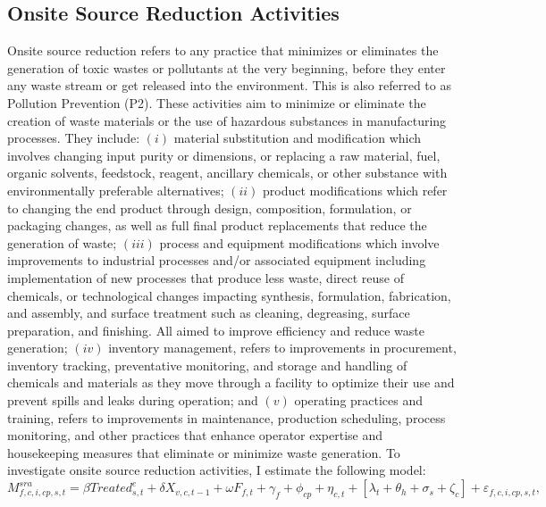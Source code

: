 \documentclass[12pt, english]{article}
\begin{document}
    \subsection{Onsite Source Reduction Activities}\label{subsec:onsite-source-reduction-activities}
    Onsite source reduction refers to any practice that minimizes or eliminates the generation of toxic wastes or pollutants at the very beginning, before they enter any waste stream or get released into the environment. This is also referred to as Pollution Prevention (P2). These activities aim to minimize or eliminate the creation of waste materials or the use of hazardous substances in manufacturing processes. They include: $(i)$ material substitution and modification which involves changing input purity or dimensions, or replacing a raw material, fuel, organic solvents, feedstock, reagent, ancillary chemicals, or other substance with environmentally preferable alternatives; $(ii)$ product modifications which refer to changing the end product through design, composition, formulation, or packaging changes, as well as full final product replacements that reduce the generation of waste; $(iii)$ process and equipment modifications which involve improvements to industrial processes and/or associated equipment including implementation of new processes that produce less waste, direct reuse of chemicals, or technological changes impacting synthesis, formulation, fabrication, and assembly, and surface treatment such as cleaning, degreasing, surface preparation, and finishing. All aimed to improve efficiency and reduce waste generation; $(iv)$ inventory management, refers to improvements in procurement, inventory tracking, preventative monitoring, and storage and handling of chemicals and materials as they move through a facility to optimize their use and prevent spills and leaks during operation; and $(v)$ operating practices and training, refers to improvements in maintenance, production scheduling, process monitoring, and other practices that enhance operator expertise and housekeeping measures that eliminate or minimize waste generation. To investigate onsite source reduction activities, I estimate the following model:
    \begin{equation}
        M_{f,c,i,cp,s,t}^{sra} = \beta Treated_{s,t}^e + \delta X_{v,c,t-1} + \omega F_{f,t} + \gamma_{f} + \phi_{cp} + \eta_{c,t} + \left[\lambda_{t} + \theta_{h} + \sigma_{s} + \zeta_{c} \right] + \varepsilon_{f,c,i,cp,s,t},\label{eq:mechanisms-source-reduction}
    \end{equation}
\end{document}
